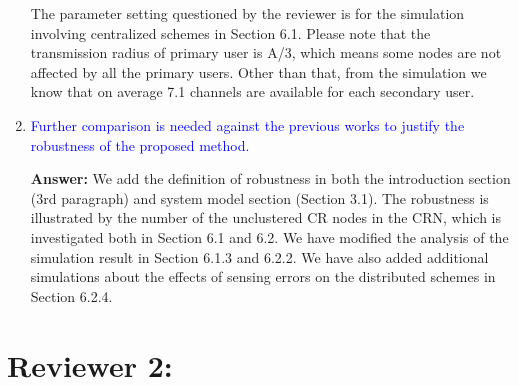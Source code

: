 \documentclass[10pt,a4paper]{article}
\begin{document}
\begin{enumerate}
The parameter setting questioned by the reviewer is for the simulation involving centralized schemes in Section 6.1.
    Please note that the transmission radius of primary user is A/3, which means some nodes are not affected by all the primary users.
    Other than that, from the simulation we know that on average 7.1 channels are available for each secondary user.
    
\item \textcolor{blue}{ Further comparison is needed against the previous works to justify the robustness of the proposed method.}

\textbf{Answer:} 	We add the definition of robustness in both the introduction section (3rd paragraph) and system model section (Section 3.1).
The robustness is illustrated by the number of the unclustered CR nodes in the CRN, which is investigated both in Section 6.1 and 6.2.
We have modified the analysis of the simulation result in Section 6.1.3 and 6.2.2.
We have also added additional simulations about the effects of sensing errors on the distributed schemes in Section 6.2.4.

\end{enumerate}

\section{Reviewer 2:}
\end{document}
